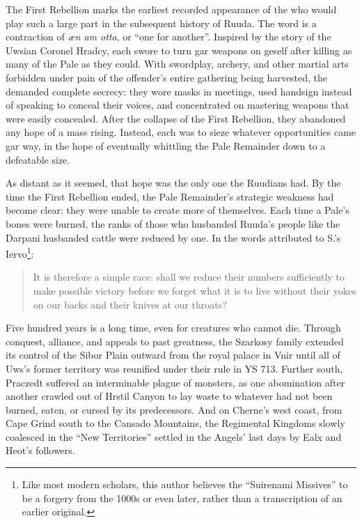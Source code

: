 \documentclass[12pt]{report}
\begin{document}
The First Rebellion marks the earliest recorded appearance of the
{\aemott} who would play such a large part in the subsequent history
of Ruuda.  The word is a contraction of \emph{{\ae}n am otta}, or ``one
for another''.  Inspired by the story of the Uwsian Coronel Hradcy,
each {\aemott} swore to turn gar weapons on geself after killing as
many of the Pale as they could.  With swordplay, archery, and other
martial arts forbidden under pain of the offender's entire gathering
being harvested, the {\aemott} demanded complete secrecy: they wore
masks in meetings, used handsign instead of speaking to conceal their
voices, and concentrated on mastering weapons that were easily
concealed.  After the collapse of the First Rebellion, they abandoned
any hope of a mass rising.  Instead, each {\aemott} was to sieze
whatever opportunities came gar way, in the hope of eventually
whittling the Pale Remainder down to a defeatable size.

As distant as it seemed, that hope was the only one the Ruudians had.
By the time the First Rebellion ended, the Pale Remainder's strategic
weakness had become clear: they were unable to create more of
themselves.  Each time a Pale's bones were burned, the ranks of those
who husbanded Ruuda's people like the Darpani husbanded cattle were
reduced by one.  In the words attributed to S.'s Iervo\footnote{Like
most modern scholars, this author believes the ``Suirenami Missives'' to
be a forgery from the 1000s or even later, rather than a transcription
of an earlier original.}:

\begin{quotation}
It is therefore a simple race: shall we reduce their numbers
sufficiently to make possible victory before we forget what it is to
live without their yokes on our backs and their knives at our throats?
\end{quotation}

Five hundred years is a long time, even for creatures who cannot die.
Through conquest, alliance, and appeals to past greatness, the
Szarkosy family extended its control of the Sibor Plain outward from
the royal palace in Vnir until all of Uws's former territory was
reunified under their rule in YS 713.  Further south, Praczedt
suffered an interminable plague of monsters, as one abomination after
another crawled out of Hrstil Canyon to lay waste to whatever had not
been burned, eaten, or cursed by its predecessors.  And on Cherne's
west coast, from Cape Grind south to the Cansado Mountains, the
Regimental Kingdoms slowly coalesced in the ``New Territories'' settled
in the Angels' last days by Ealx and Heot's followers.
\end{document}
